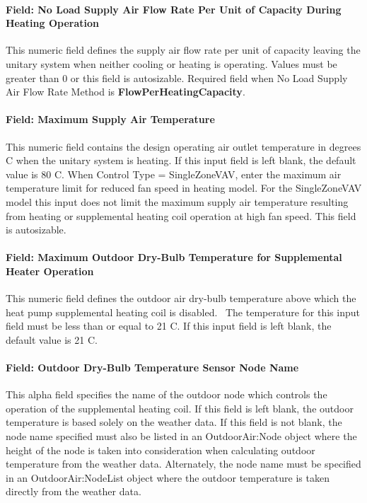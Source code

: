 \paragraph{Field: No Load Supply Air Flow Rate Per Unit of Capacity During Heating Operation}\label{field-no-load-supply-air-flow-rate-per-unit-of-capacity-during-heating-operation}

This numeric field defines the supply air flow rate per unit of capacity leaving the unitary system when neither cooling or heating is operating. Values must be greater than 0 or this field is autosizable. Required field when No Load Supply Air Flow Rate Method is \textbf{FlowPerHeatingCapacity}.

\paragraph{Field: Maximum Supply Air Temperature}\label{field-maximum-supply-air-temperature-000}

This numeric field contains the design operating air outlet temperature in degrees C when the unitary system is heating. If this input field is left blank, the default value is 80 C. When Control Type = SingleZoneVAV, enter the maximum air temperature limit for reduced fan speed in heating model. For the SingleZoneVAV model this input does not limit the maximum supply air temperature resulting from heating or supplemental heating coil operation at high fan speed.  This field is autosizable.


\paragraph{Field: Maximum Outdoor Dry-Bulb Temperature for Supplemental Heater Operation}\label{field-maximum-outdoor-dry-bulb-temperature-for-supplemental-heater-operation}

This numeric field defines the outdoor air dry-bulb temperature above which the heat pump supplemental heating coil is disabled.~ The temperature for this input field must be less than or equal to 21 C. If this input field is left blank, the default value is 21 C.

\paragraph{Field: Outdoor Dry-Bulb Temperature Sensor Node Name}\label{field-outdoor-dry-bulb-temperature-sensor-node-name}

This alpha field specifies the name of the outdoor node which controls the operation of the supplemental heating coil. If this field is left blank, the outdoor temperature is based solely on the weather data. If this field is not blank, the node name specified must also be listed in an OutdoorAir:Node object where the height of the node is taken into consideration when calculating outdoor temperature from the weather data. Alternately, the node name must be specified in an OutdoorAir:NodeList object where the outdoor temperature is taken directly from the weather data.

